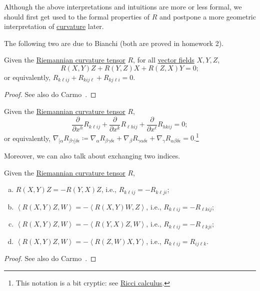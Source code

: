 \begin{note}
	Although the above interpretations and intuitions are more or less formal, we should first get used to the formal properties of \(R\) and postpone a more geometric interpretation of \hyperref[def:Riemannian-curvature]{curvature} later.
\end{note}

The following two are due to Bianchi (both are proved in homework 2).

\begin{proposition}\label{prop:1st-Bianchi-identity}
	Given the \hyperref[def:Riemannian-curvature]{Riemannian curvature tensor} \(R\), for all \hyperref[def:vector-field]{vector fields} \(X, Y, Z\),
	\[
		R(X, Y)Z + R(Y, Z)X + R(Z, X)Y = 0;
	\]
	or equivalently, \(R_{k \ell i j} + R_{k ij \ell } + R_{k j \ell i} = 0\).
\end{proposition}
\begin{proof}
	See also do Carmo~\cite[Proposition 2.4]{flaherty2013riemannian}.
\end{proof}

\begin{proposition}\label{prop:2nd-Bianchi-identity}
	Given the \hyperref[def:Riemannian-curvature]{Riemannian curvature tensor} \(R\),
	\[
		\frac{\partial }{\partial x^h} R_{k \ell i j} + \frac{\partial }{\partial x^k} R_{\ell h i j} + \frac{\partial }{\partial x^{\ell } } R_{h k i j} = 0;
	\]
	or equivalently, \(\nabla _{[\alpha} R_{\beta \gamma ]\delta \epsilon }\coloneqq \nabla _\alpha R_{\beta \gamma \delta \epsilon }+ \nabla _\beta R_{\gamma \alpha \delta \epsilon }+ \nabla _\gamma R_{\alpha \beta \delta \epsilon }= 0\).\footnote{This notation is a bit cryptic: see \href{https://en.wikipedia.org/wiki/Ricci_calculus}{Ricci calculus}.}
\end{proposition}

Moreover, we can also talk about exchanging two indices.

\begin{proposition}
	Given the \hyperref[def:Riemannian-curvature]{Riemannian curvature tensor} \(R\),
	\begin{enumerate}[(a)]
		\item \(R(X, Y)Z = -R(Y, X)Z\), i.e., \(R_{k \ell i j} = -R_{k \ell j i}\);
		\item \(\left\langle R(X, Y)Z, W \right\rangle = -\left\langle R(X, Y)W, Z \right\rangle\), i.e., \(R_{k \ell i j} = -R_{\ell k i j}\);
		\item \(\left\langle R(X, Y)Z, W \right\rangle = -\left\langle R(Y, X)Z, W \right\rangle\), i.e., \(R_{k \ell i j} = -R_{\ell k j i}\);
		\item \(\left\langle R(X, Y)Z, W \right\rangle = -\left\langle R(Z, W)X, Y \right\rangle\), i.e., \(R_{k \ell i j} = R_{i j \ell k}\).
	\end{enumerate}
\end{proposition}
\begin{proof}
	See also do Carmo~\cite[Proposition 2.5]{flaherty2013riemannian}.
\end{proof}

